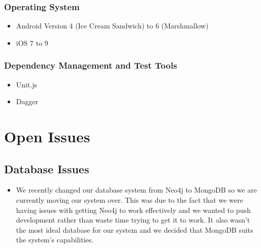 \documentclass[11pt,fleqn]{book} %
\begin{document}
	\subsection{Operating System}
	\begin{itemize}
		\item Android Version 4 (Ice Cream Sandwich) to 6 (Marshmallow)
		\item iOS 7 to 9				
	\end{itemize}
	\subsection{Dependency Management and Test Tools}
	\begin{itemize}
		\item Unit.js
		\item Dagger
	\end{itemize}
	
	
	
	\chapter{Open Issues}
	
	\section{Database Issues}
	\begin{itemize}
		\item We recently changed our database system from Neo4j to MongoDB so we are currently moving our system over. This was due to the fact that we were having issues with getting Neo4j to work effectively and we wanted to push development rather than waste time trying to get it to work. It also wasn't the most ideal database for our system and we decided that MongoDB suits the system's capabilities.
	\end{itemize}
	
\end{document}

